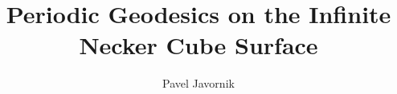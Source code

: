 \documentclass[a4paper, 11pt]{article}
\begin{document}
\newtheorem{thm}{Theorem}[]
\newtheorem{Def}{Definition}[]
\newtheorem*{thm*}{Theorem}
\newtheorem*{def*}{Definition}
\newtheorem{lem}{Lemma}
\newtheorem*{rem}{Remark}
\newcommand{\shiftleft}[2]{\makebox[0pt][r]{\makebox[#1][l]{#2}}}
\newtheorem*{conj}{Conjecture}
\newtheorem{cor}{Corollary}[]

\newcommand{\compav}[1]{\textbf{\textcolor{blue}{#1}}}
\newcommand{\compat}[1]{\textbf{\textcolor{red}{#1}}}
\graphicspath{{images/}}


\setlength{\topmargin}{1in} %
\setlength{\oddsidemargin}{\topmargin} %

\setlength{\textheight}{11in} \setlength{\textwidth}{8.5in}
\setlength{\hoffset}{-1in} \setlength{\voffset}{-1in} \setlength{\evensidemargin}{\oddsidemargin} \addtolength{\textheight}{-2 \topmargin}\addtolength{\textwidth}{-2\oddsidemargin}
\setlength{\headheight}{0pt} \setlength{\headsep}{20pt} \setlength{\footskip}{20pt}
\addtolength{\textheight}{-\footskip} \addtolength{\textheight}{-\headheight} \addtolength{\textheight}{-\headsep}


\title{Periodic Geodesics on the Infinite Necker Cube Surface}
\author{Pavel Javornik}

\maketitle

%
\end{document}
